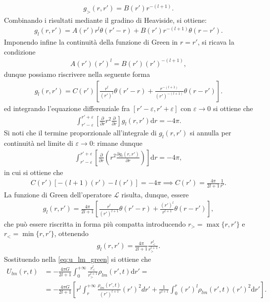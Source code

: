 \begin{align}
    g_>(r, r') = B(r')r^{-(l+1)}.
\end{align}
Combinando i risultati mediante il gradino di Heaviside, si ottiene:
\begin{align}
    g_l(r, r') = A(r')r^l \theta(r'-r) + B(r')r^{-(l+1)}\theta(r-r').
\end{align}
Imponendo infine la continuità della funzione di Green in $r = r'$, si ricava la condizione
\begin{align}
    A(r')(r')^l = B(r')(r')^{-(l+1)},
\end{align}
dunque possiamo riscrivere nella seguente forma
\begin{align}
    g_l(r, r') = C(r') \left[ \frac{r^l}{(r')^l}\theta(r'-r) + \frac{r^{-(l+1)}}{(r')^{-(l+1)}}\theta(r-r') \right].
\end{align}
ed integrando l'equazione differenziale fra $[r'-\varepsilon, r'+\varepsilon]$ con $\varepsilon \to 0$ si ottiene che
\begin{align}
	\int_{r'-\varepsilon}^{r'+\varepsilon} \left[ \frac{\partial}{\partial r} r^2 \frac{\partial}{\partial r} \right] g_l(r, r') \mathrm{d}r = -4 \pi.
\end{align} 
Si noti che il termine proporzionale all'integrale di $g_l(r, r')$ si annulla per continuità nel limite di $\varepsilon \to 0$: rimane dunque
\begin{align}
	\int_{r'-\varepsilon}^{r'+\varepsilon} \left[ \frac{\partial}{\partial r} \left( r^2 \frac{\partial g_l(r, r')}{\partial r} \right) \right] \mathrm{d}r = -4 \pi,
\end{align}
in cui si ottiene che
\begin{align}
    C(r')[-(l+1)(r') - l(r')] = -4 \pi \implies C(r') = \frac{4 \pi}{2l+1} \frac{1}{r'}.
\end{align}
La funzione di Green dell'operatore $\mathcal{L}$ risulta, dunque, essere
\begin{align}
    g_l(r, r') = \frac{4 \pi}{2l+1} \left[ \frac{r^l}{(r')^{l+1}} \theta(r' - r) + \frac{(r')^{l}}{r^{l+1}} \theta(r-r') \right],
\end{align}
che può essere riscritta in forma più compatta introducendo $r_> = \max\{r, r'\}$ e $r_< = \min\{r, r'\}$, ottenendo
\begin{align}
    g_l(r, r') = \frac{4 \pi}{2l+1} \frac{r_<^l}{r_>^{l+1}}.
\end{align}
Sostituendo nella \eqref{eq:u_lm_green} si ottiene che
\begin{align} \label{eq:u_lm_sol}
    U_{lm}(r, t) &= -\frac{4 \pi G}{2l+1} \int_{0}^{+\infty} \frac{r^l_<}{r_>^{l+1}} \rho_{lm}(r', t) \mathrm{d}r' = \nonumber \\
    &= -\frac{4 \pi G}{2l+1} \left[ r^l \int_r^{+\infty} \frac{\rho_{lm}(r', t)}{(r')^{l+1}} (r')^2 dr' + \frac{1}{r^{l+1}} \int_0^r (r')^l \rho_{lm}(r', t)(r')^2 \mathrm{d}r' \right].
\end{align}
